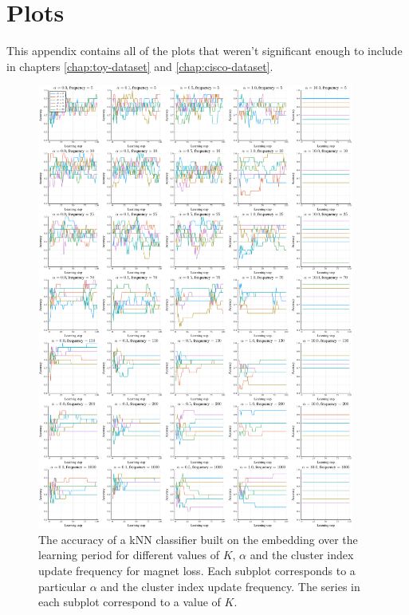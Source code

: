 \renewcommand{\chaptername}{Appendix}
\setcounter{chapter}{0}
\renewcommand{\thechapter}{\Alph{chapter}}

\chapter{Plots}

This appendix contains all of the plots that weren't significant enough to include in chapters \ref{chap:toy-dataset} and \ref{chap:cisco-dataset}.

\begin{figure}
  \centering
  \includegraphics[width=0.93\textwidth]{images/magnet-gridsearch/accuracy/K/magnet-gridsearch-accuracy-K.pdf}
  \caption{The accuracy of a kNN classifier built on the embedding over the learning period for different values of \( K \), \( \alpha \) and the cluster index update frequency for magnet loss. Each subplot corresponds to a particular \( \alpha \) and the cluster index update frequency. The series in each subplot correspond to a value of \( K \).}\label{fig:magnet-gridsearch-accuracy}
\end{figure}

